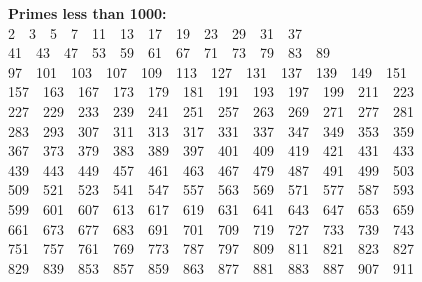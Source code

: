 \documentclass[10pt, twocolumn]{article}
\begin{document}
\begin{flushleft}
\textbf{Primes less than 1000:}\\
2$\quad$3$\quad$5$\quad$7$\quad$11$\quad$13$\quad$17$\quad$19$\quad$23$\quad$29$\quad$31$\quad$37\\

41$\quad$43$\quad$47$\quad$53$\quad$59$\quad$61$\quad$67$\quad$71$\quad$73$\quad$79$\quad$83$\quad$89\\

97$\quad$101$\quad$103$\quad$107$\quad$109$\quad$113$\quad$127$\quad$131$\quad$137$\quad$139$\quad$149$\quad$151\\

157$\quad$163$\quad$167$\quad$173$\quad$179$\quad$181$\quad$191$\quad$193$\quad$197$\quad$199$\quad$211$\quad$223\\

227$\quad$229$\quad$233$\quad$239$\quad$241$\quad$251$\quad$257$\quad$263$\quad$269$\quad$271$\quad$277$\quad$281\\

283$\quad$293$\quad$307$\quad$311$\quad$313$\quad$317$\quad$331$\quad$337$\quad$347$\quad$349$\quad$353$\quad$359\\

367$\quad$373$\quad$379$\quad$383$\quad$389$\quad$397$\quad$401$\quad$409$\quad$419$\quad$421$\quad$431$\quad$433\\

439$\quad$443$\quad$449$\quad$457$\quad$461$\quad$463$\quad$467$\quad$479$\quad$487$\quad$491$\quad$499$\quad$503\\

509$\quad$521$\quad$523$\quad$541$\quad$547$\quad$557$\quad$563$\quad$569$\quad$571$\quad$577$\quad$587$\quad$593\\

599$\quad$601$\quad$607$\quad$613$\quad$617$\quad$619$\quad$631$\quad$641$\quad$643$\quad$647$\quad$653$\quad$659\\

661$\quad$673$\quad$677$\quad$683$\quad$691$\quad$701$\quad$709$\quad$719$\quad$727$\quad$733$\quad$739$\quad$743\\

751$\quad$757$\quad$761$\quad$769$\quad$773$\quad$787$\quad$797$\quad$809$\quad$811$\quad$821$\quad$823$\quad$827\\

829$\quad$839$\quad$853$\quad$857$\quad$859$\quad$863$\quad$877$\quad$881$\quad$883$\quad$887$\quad$907$\quad$911\\


\end{flushleft}
\end{document}
